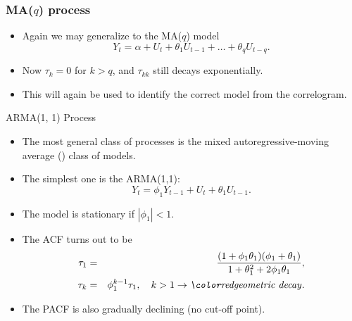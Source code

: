 \begin{frame}\frametitle{MA($q$) process}
\begin{itemize}
\item
Again we may generalize to the MA($q$) model
\begin{equation*}
Y_t=\alpha + U_t + \theta _1 U_{t-1} + \ldots + \theta _q U_{t-q} .
\end{equation*}
\item Now $\tau _k=0$ for $k>q$, and $\tau_{kk}$ still decays exponentially.
\item This will again be used to identify the correct model from the correlogram.
\end{itemize}
\end{frame}

\begin{frame}{ARMA(1, 1) Process}
\begin{itemize}
\item
The most general class of processes is the mixed autoregressive-moving
average () class of models.
\item The simplest one is the ARMA(1,1):
\begin{equation*}
Y_t= \phi_1 Y_{t-1}+ U_t + \theta_1 U_{t-1}.
\end{equation*}
\item The model is stationary if $|\phi_1 |<1$.%
\item The ACF turns out to be
\begin{eqnarray*}
\tau _1 &=&\frac{(1 + \phi_1 \theta_1 )(\phi_1 + \theta_1 )}{1+\theta_1
^2+2\phi_1 \theta_1 }, \\
\tau _k &=&\phi_1 ^{k-1}\tau _1,\quad k>1 \rightarrow\text{\er{geometric decay}}.
\end{eqnarray*}
\item The PACF is also gradually declining (no cut-off point).
\end{itemize}
\end{frame}

